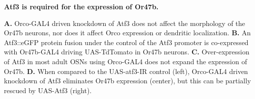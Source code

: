 {\bf Atf3 is required for the expression of Or47b.}

\textbf{A.} Orco-GAL4 driven knockdown of Atf3 does not affect the morphology of the Or47b neurons, nor does it affect Orco expression or dendritic localization.
\textbf{B.} An Atf3::eGFP protein fusion under the control of the Atf3 promoter is co-expressed with Or47b-GAL4 driving UAS-TdTomato in Or47b neurons.
\textbf{C.} Over-expression of Atf3 in most adult OSNs using Orco-GAL4 does not expand the expression of Or47b.
\textbf{D.} When compared to the UAS-atf3-IR control (left), Orco-GAL4 driven knockdown of Atf3 eliminates Or47b expression (center), but this can be partially rescued by UAS-Atf3 (right).
\label{fig:3}